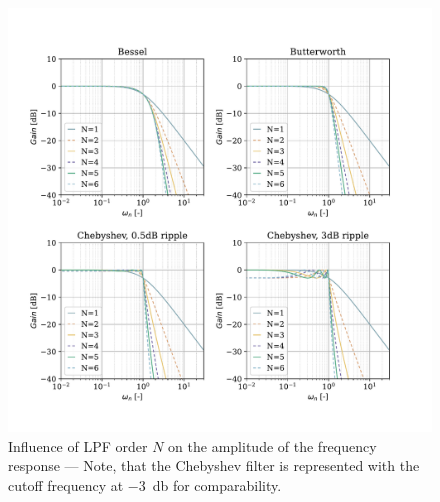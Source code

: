 \begin{figure}[!htb]
  \centering
  \includegraphics[scale=0.72]{figures/electronics/lowpass/lp_filter_mag}
  \caption[Influence of \ac{LPF} order $N$ on the amplitude of the frequency response]{Influence of \ac{LPF} order $N$ on the amplitude of the frequency response --- Note, that the Chebyshev filter is represented with the cutoff frequency at \SI{-3}{\decibel} for comparability.%
    \label{fig:lp_filter_mag}}
\end{figure}
